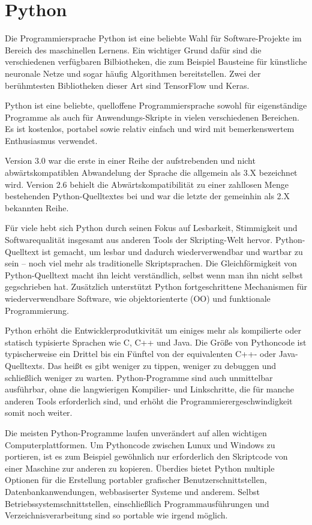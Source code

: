 \section{Python}
\label{subsec:python}
Die Programmiersprache Python ist eine beliebte Wahl für Software-Projekte im Bereich des maschinellen Lernens. Ein wichtiger Grund dafür sind die verschiedenen verfügbaren Bilbiotheken, die zum Beispiel Bausteine für künstliche neuronale Netze und sogar häufig Algorithmen bereitstellen. Zwei der berühmtesten Bibliotheken dieser Art sind TensorFlow und Keras.

Python ist eine beliebte, quelloffene Programmiersprache sowohl für eigenständige Programme als auch für Anwendungs-Skripte in vielen verschiedenen Bereichen. Es ist kostenlos, portabel sowie relativ einfach und wird  mit bemerkenswertem Enthusiasmus verwendet. \cite{lutz2013python}

Version 3.0 war die erste in einer Reihe der aufstrebenden und nicht abwärtskompatiblen Abwandelung der Sprache die allgemein als 3.X bezeichnet wird. Version 2.6 behielt die Abwärtskompatibilität zu einer zahllosen Menge bestehenden Python-Quelltextes bei und war die letzte der gemeinhin als 2.X bekannten Reihe.  \cite{lutz2013python}

Für viele hebt sich Python durch seinen Fokus auf Lesbarkeit, Stimmigkeit und Softwarequalität insgesamt aus anderen Tools der Skripting-Welt hervor. Python-Quelltext ist gemacht, um lesbar und dadurch wiederverwendbar und wartbar zu sein -- noch viel mehr als traditionelle Skriptsprachen. Die Gleichförmigkeit von Python-Quelltext macht ihn leicht verständlich, selbst wenn man ihn nicht selbst gegschrieben hat. Zusätzlich unterstützt Python fortgeschrittene Mechanismen für wiederverwendbare Software, wie objektorienterte (OO) und funktionale Programmierung.

Python erhöht die Entwicklerprodutkivität um einiges mehr als kompilierte oder statisch typisierte Sprachen wie C, C++ und Java. Die Größe von Pythoncode ist typischerweise ein Drittel bis ein Fünftel von der equivalenten C++- oder Java-Quelltexts. Das heißt es gibt weniger zu tippen, weniger zu debuggen und schließlich weniger zu warten. Python-Programme sind auch unmittelbar ausführbar, ohne die langwierigen Kompilier- und Linkschritte, die für manche anderen Tools erforderlich sind, und erhöht die Programmierergeschwindigkeit somit noch weiter.

Die meisten Python-Programme laufen unverändert auf allen wichtigen Computerplattformen. Um Pythoncode zwischen Lunux und Windows zu portieren, ist es zum Beispiel gewöhnlich nur erforderlich den Skriptcode von einer Maschine zur anderen zu kopieren. Überdies bietet Python multiple Optionen für die Erstellung portabler grafischer Benutzerschnittstellen, Datenbankanwendungen, webbasiserter Systeme und anderem. Selbst Betriebssystemschnittstellen, einschließlich Programmausführungen und Verzeichnisverarbeitung sind so portable wie irgend möglich.

